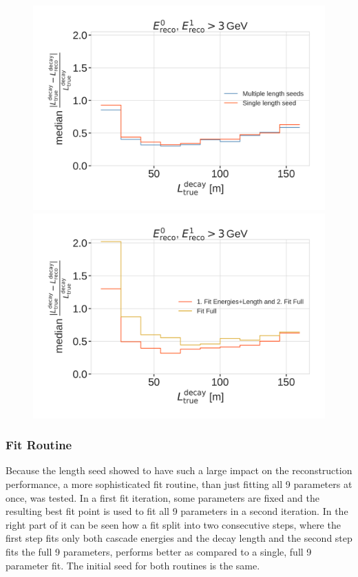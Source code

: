 \begin{figure}[h]
	\centering
    \includegraphics[width=0.49\linewidth]{figures/results/190605_reco_optimization/decay_length_seeding_median_decay_length_resolution_Good + L7 + reco E1,E2 above 3_fix_y.png}
    \includegraphics[width=0.49\linewidth]{figures/results/190605_reco_optimization/fit_routine_splitting_median_decay_length_resolution_Good + L7 + reco E1,E2 above 3_fix_y.png}
    \caption[]{}


\end{figure}


\subsubsection{Fit Routine}

Because the length seed showed to have such a large impact on the reconstruction performance, a more sophisticated fit routine, than just fitting all 9 parameters at once, was tested. In a first fit iteration, some parameters are fixed and the resulting best fit point is used to fit all 9 parameters in a second iteration. In the right part of  it can be seen how a fit split into two consecutive steps, where the first step fits only both cascade energies and the decay length and the second step fits the full 9 parameters, performs better as compared to a single, full 9 parameter fit. The initial seed for both routines is the same.


